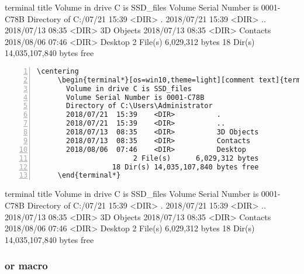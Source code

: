 \documentclass{ctxdoc}
\begin{document}
\begin{center}
\begin{minipage}{0.85\textwidth}
\begin{terminal}{terminal title}
  Volume in drive C is SSD_files
  Volume Serial Number is 0001-C78B
  Directory of C:\Users{}/07/21  15:39    <DIR>          .
2018/07/21  15:39    <DIR>          ..
2018/07/13  08:35    <DIR>          3D Objects
2018/07/13  08:35    <DIR>          Contacts
2018/08/06  07:46    <DIR>          Desktop
                2 File(s)      6,029,312 bytes
           18 Dir(s) 14,035,107,840 bytes free
\end{terminal}
\end{minipage}
\end{center}

   \begin{Verbatim}[frame=none,numbers=left,gobble=5]
     \centering
     \begin{terminal*}[os=win10,theme=light][comment text]{terminal title}
       Volume in drive C is SSD_files
       Volume Serial Number is 0001-C78B
       Directory of C:\Users\Administrator
       2018/07/21  15:39    <DIR>          .
       2018/07/21  15:39    <DIR>          ..
       2018/07/13  08:35    <DIR>          3D Objects
       2018/07/13  08:35    <DIR>          Contacts
       2018/08/06  07:46    <DIR>          Desktop
                       2 File(s)      6,029,312 bytes
                  18 Dir(s) 14,035,107,840 bytes free
     \end{terminal*}
   \end{Verbatim}

\begin{center}
\begin{minipage}{0.85\textwidth}
\begin{terminal*}{terminal title}
  Volume in drive C is SSD_files
  Volume Serial Number is 0001-C78B
  Directory of C:\Users{}/07/21  15:39    <DIR>          .
2018/07/21  15:39    <DIR>          ..
2018/07/13  08:35    <DIR>          3D Objects
2018/07/13  08:35    <DIR>          Contacts
2018/08/06  07:46    <DIR>          Desktop
                2 File(s)      6,029,312 bytes
           18 Dir(s) 14,035,107,840 bytes free
\end{terminal*}
\end{minipage}
\end{center}

 \subsubsection{ or  macro}
\end{document}
